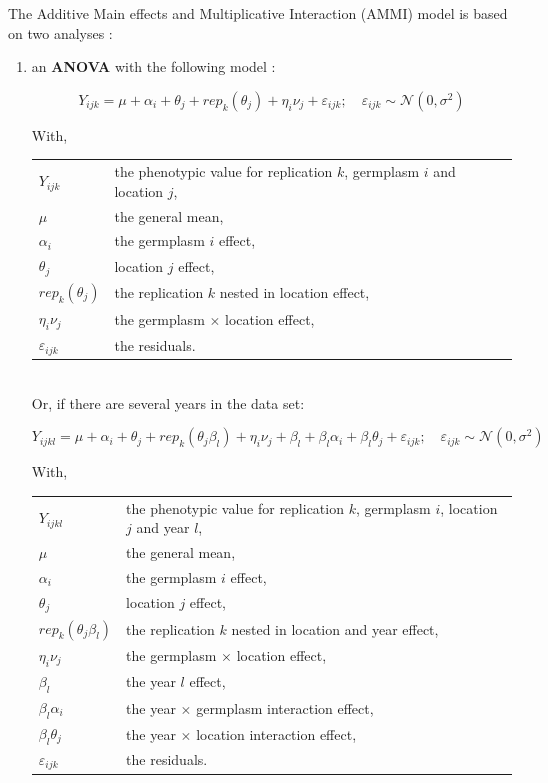 \documentclass{book}\usepackage[]{graphicx}\usepackage[]{color}
\begin{document}
The Additive Main effects and Multiplicative Interaction (AMMI) model is based on two analyses \citep{gauch_statistical_2006} : 
\begin{enumerate}

\item an \textbf{ANOVA} with the following model :

\begin{equation}
Y_{ijk} = \mu + \alpha_{i} + \theta_{j} + rep_{k}(\theta_{j}) + \eta_{i}\nu_{j} + \varepsilon_{ijk}; \quad \varepsilon_{ijk} \sim \mathcal{N} (0,\sigma^2)
\label{ammi_anova}
\end{equation}

With,

\begin{tabular}{ll}
$Y_{ijk}$ & the phenotypic value for replication $k$, germplasm $i$ and location $j$, \\
$\mu$ & the general mean, \\
$\alpha_{i}$ & the germplasm $i$ effect, \\
$\theta_{j}$ & location $j$ effect, \\
$rep_{k}(\theta_{j})$ & the replication $k$ nested in location effect, \\
$\eta_{i}\nu_{j}$ & the germplasm $\times$ location effect, \\
$\varepsilon_{ijk}$ & the residuals.\\
\end{tabular}

~\\ 

Or, if there are several years in the data set:

\begin{equation}
Y_{ijkl} = \mu + \alpha_{i} + \theta_{j} + rep_{k}(\theta_{j}\beta_{l}) + \eta_{i}\nu_{j} + 
\beta_{l} + \beta_{l}\alpha_{i} + \beta_{l}\theta_{j} + 
\varepsilon_{ijk}; \quad \varepsilon_{ijk} \sim \mathcal{N} (0,\sigma^2)
\label{ammi_anova}
\end{equation}

With,

\begin{tabular}{ll}
$Y_{ijkl}$ & the phenotypic value for replication $k$, germplasm $i$, location $j$ and year $l$, \\
$\mu$ & the general mean, \\
$\alpha_{i}$ & the germplasm $i$ effect, \\
$\theta_{j}$ & location $j$ effect, \\
$rep_{k}(\theta_{j}\beta_{l})$ & the replication $k$ nested in location and year effect, \\
$\eta_{i}\nu_{j}$ & the germplasm $\times$ location effect, \\
$\beta_{l}$ & the year $l$ effect, \\
$\beta_{l}\alpha_{i}$ & the year $\times$ germplasm interaction effect, \\
$\beta_{l}\theta_{j}$ & the year $\times$ location interaction effect, \\
$\varepsilon_{ijk}$ & the residuals.\\
\end{tabular}



\end{enumerate}
\end{document}
